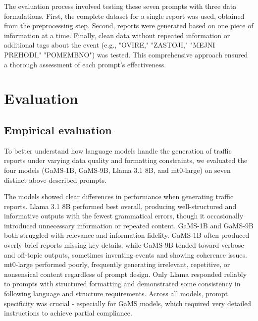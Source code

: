 \documentclass[fleqn,moreauthors,10pt]{ds_report}
\begin{document}
The evaluation process involved testing these seven prompts with three data formulations. First, the complete dataset for a single report was used, obtained from the preprocessing step. Second, reports were generated based on one piece of information at a time. Finally, clean data without repeated information or additional tags about the event (e.g., "OVIRE," "ZASTOJI," "MEJNI PREHODI," "POMEMBNO") was tested. This comprehensive approach ensured a thorough assessment of each prompt's effectiveness.

\section*{Evaluation}

\subsection*{Empirical evaluation}

To better understand how language models handle the generation of traffic reports under varying data quality and formatting constraints, we evaluated the four models (GaMS-1B, GaMS-9B, Llama 3.1 8B, and mt0-large) on seven distinct above-described prompts.

The models showed clear differences in performance when generating traffic reports. Llama 3.1 8B performed best overall, producing well-structured and informative outputs with the fewest grammatical errors, though it occasionally introduced unnecessary information or repeated content. GaMS-1B and GaMS-9B both struggled with relevance and information fidelity. GaMS-1B often produced overly brief reports missing key details, while GaMS-9B tended toward verbose and off-topic outputs, sometimes inventing events and showing coherence issues. mt0-large performed poorly, frequently generating irrelevant, repetitive, or nonsensical content regardless of prompt design. Only Llama responded reliably to prompts with structured formatting and demonstrated some consistency in following language and structure requirements. Across all models, prompt specificity was crucial - especially for GaMS models, which required very detailed instructions to achieve partial compliance.
\end{document}
